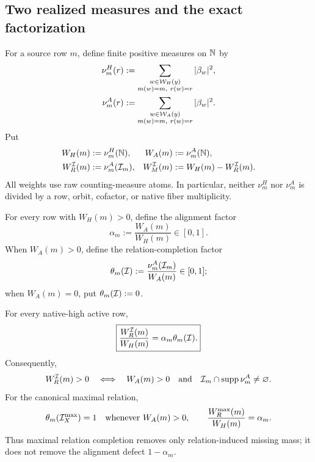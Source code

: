 \subsection{Two realized measures and the exact factorization}

For a source row \(m\), define finite positive measures on \(\mathbb N\) by
\begin{align}
 \nu_m^H(r)
 &:=\sum_{\substack{w\in\mathcal W_H(y)\\
                    m(w)=m,\ r(w)=r}}|\beta_w|^2,
 \label{eq:exposure-native-high-measure}\\
 \nu_m^A(r)
 &:=\sum_{\substack{w\in\mathcal W_A(y)\\
                    m(w)=m,\ r(w)=r}}|\beta_w|^2.
 \label{eq:exposure-admissible-high-measure}
\end{align}
Put
\begin{align}
 W_H(m)&:=\nu_m^H(\mathbb N),
 &W_A(m)&:=\nu_m^A(\mathbb N),
 \label{eq:exposure-high-admissible-row-weights}\\
 W_R^{\mathcal I}(m)&:=\nu_m^A(\mathcal I_m),
 &W_M^{\mathcal I}(m)&:=W_H(m)-W_R^{\mathcal I}(m).
 \label{eq:exposure-represented-missing-row-weights}
\end{align}
All weights use raw counting-measure atoms.  In particular, neither
\(\nu_m^H\) nor \(\nu_m^A\) is divided by a row, orbit, cofactor, or native
fiber multiplicity.

For every row with \(W_H(m)>0\), define the alignment factor
\begin{equation}
 \alpha_m:=\frac{W_A(m)}{W_H(m)}\in[0,1].
 \label{eq:exposure-alignment-factor}
\end{equation}
When \(W_A(m)>0\), define the relation-completion factor
\begin{equation}
 \theta_m(\mathcal I)
 :=\frac{\nu_m^A(\mathcal I_m)}{W_A(m)}\in[0,1];
 \label{eq:exposure-completion-factor}
\end{equation}
when \(W_A(m)=0\), put \(\theta_m(\mathcal I):=0\).

\begin{theorem}
\label{thm:exposure-exact-factorization}
For every native-high active row,
\begin{equation}
 \boxed{
 \frac{W_R^{\mathcal I}(m)}{W_H(m)}
 =\alpha_m\theta_m(\mathcal I).}
 \label{eq:exposure-alpha-theta-factorization}
\end{equation}
Consequently,
\begin{equation}
 W_R^{\mathcal I}(m)>0
 \quad\Longleftrightarrow\quad
 W_A(m)>0
 \quad\text{and}\quad
 \mathcal I_m\cap\operatorname{supp}\nu_m^A\ne\varnothing.
 \label{eq:exposure-positive-row-criterion}
\end{equation}
For the canonical maximal relation,
\begin{equation}
 \theta_m(\mathcal I_X^{\max})=1
 \quad\text{whenever }W_A(m)>0,
 \qquad
 \frac{W_R^{\max}(m)}{W_H(m)}=\alpha_m.
 \label{eq:exposure-maximal-relation-value}
\end{equation}
Thus maximal relation completion removes only relation-induced missing
mass; it does not remove the alignment defect \(1-\alpha_m\).
\end{theorem}

